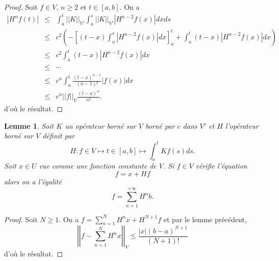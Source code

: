 \documentclass[12pt,openany,a4paper, titlepage]{article}
\newcommand{\f}[2]{\frac{#1}{#2}}
\newcommand{\lp}{\left(}
\newcommand{\rp}{\right)}
\newcommand{\lb}{\left|}
\newcommand{\rb}{\right|}
\newcommand{\lc}{\left[}
\newcommand{\rcc}{\right]}
\newcommand{\suminf}[2]{\sum_{#1=#2}^{+\infty}}
\newtheorem{lem}{Lemme}
\theoremstyle{definition}
\theoremstyle{definition}
\theoremstyle{definition}
\theoremstyle{definition}
\theoremstyle{definition}
\theoremstyle{definition}
\begin{document}
\begin{proof}
Soit $f\in V$, $n\geq 2$ et $t\in[a,b]$. On a 
\begin{eqnarray}
    |H^nf(t)| &\leq&  \int_a^t ||K||_{V'}\int_a^s||K||_{V'}|H^{n-2}f(x)|dxds \\
              &\leq& c^2 \lp -\lc (t-x)\int_a^s|H^{n-2}f(x)|dx\rcc_a^t + \int_a^t(t-x)|H^{n-2}f(x)|dx\rp \\
              &\leq& c^2 \int_a^t(t-x)|H^{n-2}f(x)|dx \\
              &\leq& \cdots \\
              &\leq& c^n \int_a^t\f{(t-x)^{n-1}}{(n-1)!}|f(x)|dx \\
              &\leq& c^n ||f||_V \f{(t-a)^n}{n!}.
\end{eqnarray}
d'où le résultat.
\end{proof}

\begin{lem}
Soit $K$ un opérateur borné sur $V$ borné par $c$ dans $V'$ et $H$ l'opérateur borné sur $V$ définit par 
$$H :f\in V \mapsto t\in[a,b] \mapsto \int_a^t Kf(s)ds.$$ Soit $x\in U$ vue comme une fonction constante de $V$. Si $f\in V$ vérifie l'équation 
$$ f = x + Hf$$
alors on a l'égalité 
$$ f = \suminf{n}{1} H^nb.$$
\end{lem}

\begin{proof}
Soit $N\geq 1$. On a $f = \sum_{n=1}^{N} H^nx + H^{N+1}f$ et par le lemme précédent, $$\lb\lb  f - \sum_{n=1}^{N} H^nx\rb\rb_V \leq \f{|x|(b-a)^{N+1}}{(N+1)!}$$ d'où le résultat.
\end{proof}
\end{document}
